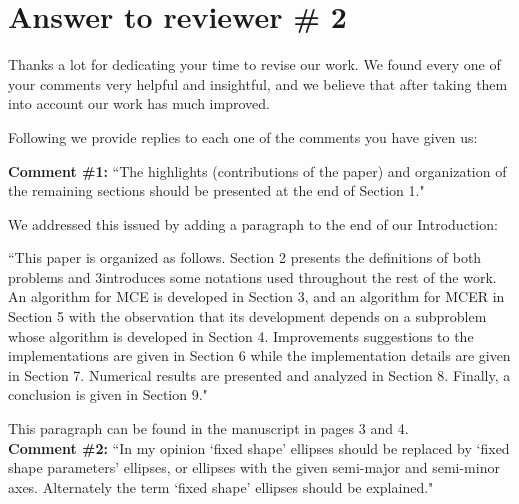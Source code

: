 
		
%
		
		\section*{Answer to reviewer \# 2}
		Thanks a lot for dedicating your time to revise our work. We found every one of your comments very helpful and insightful, and we believe that after taking them into account our work has much improved.
		
		Following we provide replies to each one of the comments you have given us:
		
		\textbf{Comment \#1:} ``The highlights (contributions of the paper) and organization of the remaining sections should be presented at the end of Section 1."
		
		We addressed this issued by adding a paragraph to the end of our Introduction:
		
		``This paper is organized as follows. Section 2 presents the definitions of both problems and
		3introduces some notations used throughout the rest of the work. An algorithm for MCE is developed
		in Section 3, and an algorithm for MCER in Section 5 with the observation that its development
		depends on a subproblem whose algorithm is developed in Section 4. Improvements suggestions to
		the implementations are given in Section 6 while the implementation details are given in Section 7.
		Numerical results are presented and analyzed in Section 8. Finally, a conclusion is given in Section 9."
		
		This paragraph can be found in the manuscript in pages 3 and 4.
		\\
		
		\textbf{Comment \#2:} ``In my opinion `fixed shape' ellipses should be replaced by `fixed shape parameters' ellipses, or ellipses with the given semi-major and semi-minor axes. Alternately the term `fixed shape' ellipses should be explained."
		
